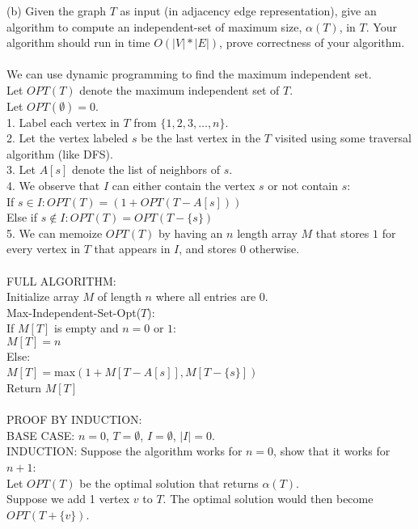 \documentclass[11pt,letterpaper]{article}
\newcommand\tab[1][1cm]{\hspace*{#1}}
\begin{document}
\pagebreak
(b) Given the graph $T$ as input (in adjacency edge representation), give an algorithm to compute an independent-set of maximum size, $\alpha(T)$, in $T$. Your algorithm should run in time $O(|V|*|E|)$, prove correctness of your algorithm. \\\\
We can use dynamic programming to find the maximum independent set. \\
Let $OPT(T)$ denote the maximum independent set of $T$. \\
Let $OPT(\emptyset)=0$. \\
1. Label each vertex in $T$ from $\{1, 2, 3, \dots, n\}$. \\
2. Let the vertex labeled $s$ be the last vertex in the $T$ visited using some traversal algorithm (like DFS). \\
3. Let $A[s]$ denote the list of neighbors of $s$. \\
4. We observe that $I$ can either contain the vertex $s$ or not contain $s$: \\
\tab If $s \in I: OPT(T) = (1 + OPT(T-A[s]))$ \\
\tab Else if $s \not \in I: OPT(T) = OPT(T-\{s\})$ \\
5. We can memoize $OPT(T)$ by having an $n$ length array $M$ that stores $1$ for every vertex in $T$ that appears in $I$, and stores $0$ otherwise. \\\\
FULL ALGORITHM: \\
Initialize array $M$ of length $n$ where all entries are $0$. \\
Max-Independent-Set-Opt($T$): \\
\tab If $M[T]$ is empty and $n=0$ or $1$: \\
\tab \tab $M[T] = n$ \\
\tab Else: \\
\tab \tab $M[T]=$max$(1+M[T-A[s]], M[T-\{s\}])$ \\
\tab Return $M[T]$ \\\\
PROOF BY INDUCTION: \\
BASE CASE: $n=0$, $T=\emptyset$, $I=\emptyset$, $|I|=0$. \\
INDUCTION: Suppose the algorithm works for $n=0$, show that it works for $n+1$: \\
\tab Let $OPT(T)$ be the optimal solution that returns $\alpha(T)$. \\
\tab Suppose we add 1 vertex $v$ to $T$. The optimal solution would then become $OPT(T+\{v\})$. \\
\end{document}
